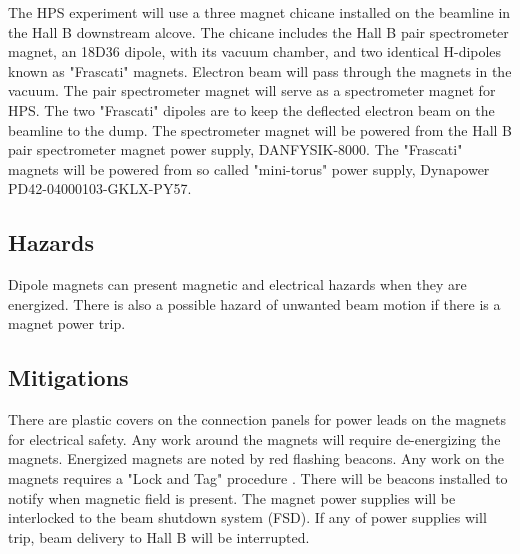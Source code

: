 

The HPS experiment will use a three magnet chicane installed on the beamline in the Hall B downstream alcove. The chicane includes the Hall B pair spectrometer magnet, an 18D36 dipole, with its vacuum chamber, and two identical H-dipoles known as "Frascati" magnets. Electron beam will pass through the magnets in the vacuum. The pair spectrometer magnet will serve as a spectrometer magnet for HPS. The two "Frascati" dipoles are to keep the deflected electron beam on the beamline to the dump. The spectrometer magnet will be powered from the Hall B pair spectrometer magnet power supply, DANFYSIK-8000. The "Frascati" magnets will be powered from so called "mini-torus" power supply, Dynapower PD42-04000103-GKLX-PY57.   

\subsection{Hazards} 
\indent

Dipole magnets can present magnetic and electrical hazards when they are energized. There is also a possible hazard of unwanted beam motion if there is a magnet power trip.  



\subsection{Mitigations}
\indent

There are plastic covers on the connection panels for power leads on the magnets for electrical safety. Any work around the magnets will require de-energizing the magnets. Energized magnets are noted by red flashing beacons. Any work on the magnets requires a "Lock and Tag" procedure \cite{ehs}. There will be beacons installed to notify when magnetic field is present. The magnet power supplies will be interlocked to the beam shutdown system (FSD). If any of power supplies will trip, beam delivery to Hall B will be interrupted.

